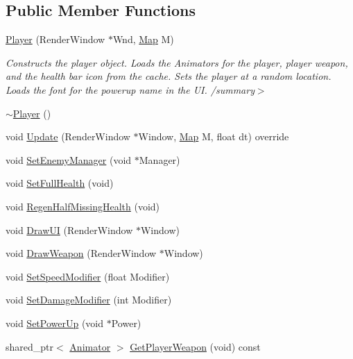 \subsection*{Public Member Functions}
\begin{DoxyCompactItemize}
\item 
\hyperlink{class_engine_1_1_game_play_1_1_player_accf9a014d2a29a17582907f6b042553b}{Player} (Render\+Window $\ast$Wnd, \hyperlink{class_engine_1_1_core_1_1_map}{Map} M)
\begin{DoxyCompactList}\small\item\em Constructs the player object. Loads the Animators for the player, player weapon, and the health bar icon from the cache. Sets the player at a random location. Loads the font for the powerup name in the UI. /summary$>$ \end{DoxyCompactList}\item 
\hyperlink{class_engine_1_1_game_play_1_1_player_a39c82fa94afe71949a7fff50fed2a4d0}{$\sim$\+Player} ()
\item 
void \hyperlink{class_engine_1_1_game_play_1_1_player_a06c682bf13c20fb2390807ec681b0121}{Update} (Render\+Window $\ast$Window, \hyperlink{class_engine_1_1_core_1_1_map}{Map} M, float dt) override
\item 
void \hyperlink{class_engine_1_1_game_play_1_1_player_adedc5552f70e5495ca1391b6f6143bec}{Set\+Enemy\+Manager} (void $\ast$Manager)
\item 
void \hyperlink{class_engine_1_1_game_play_1_1_player_a426ebc69b0607902e73563655ad66693}{Set\+Full\+Health} (void)
\item 
void \hyperlink{class_engine_1_1_game_play_1_1_player_aad2c7f9e75ef259e202be0d00924ec1d}{Regen\+Half\+Missing\+Health} (void)
\item 
void \hyperlink{class_engine_1_1_game_play_1_1_player_a4b3e08479cfc81c66eadf1e9da4a47fe}{Draw\+UI} (Render\+Window $\ast$Window)
\item 
void \hyperlink{class_engine_1_1_game_play_1_1_player_a3705c78e4c21631432c4c21a0a4e4084}{Draw\+Weapon} (Render\+Window $\ast$Window)
\item 
void \hyperlink{class_engine_1_1_game_play_1_1_player_a5a67ed64c644e9ebea338feb0db0ac98}{Set\+Speed\+Modifier} (float Modifier)
\item 
void \hyperlink{class_engine_1_1_game_play_1_1_player_a04dccb49dde0606ba440b07944abdc65}{Set\+Damage\+Modifier} (int Modifier)
\item 
void \hyperlink{class_engine_1_1_game_play_1_1_player_aa592871c49210d80e1cda615e0dee15d}{Set\+Power\+Up} (void $\ast$Power)
\item 
shared\+\_\+ptr$<$ \hyperlink{class_engine_1_1_core_1_1_animator}{Animator} $>$ \hyperlink{class_engine_1_1_game_play_1_1_player_a270ca0729136ca9105b152c5147bdbf0}{Get\+Player\+Weapon} (void) const
\end{DoxyCompactItemize}
